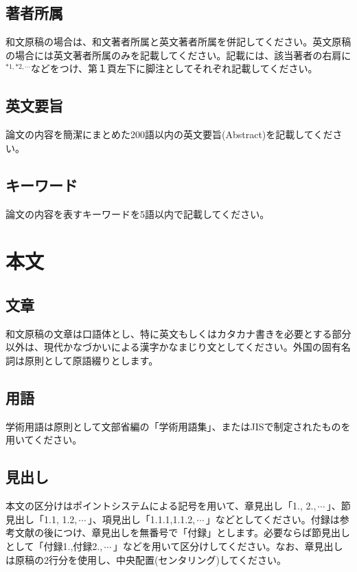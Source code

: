 \documentclass{hissymp}
\begin{document}
\subsection{著者所属}
和文原稿の場合は、和文著者所属と英文著者所属を併記してください。英文原稿の場合には英文著者所属のみを記載してください。記載には、該当著者の右肩に$^ {*1,*2,\cdots}$などをつけ、第１頁左下に脚注としてそれぞれ記載してください。

\subsection{英文要旨}
論文の内容を簡潔にまとめた200語以内の英文要旨(Abstract)を記載してください。

\subsection{キーワード}
論文の内容を表すキーワードを5語以内で記載してください。


\section{本文}

\subsection{文章}
和文原稿の文章は口語体とし、特に英文もしくはカタカナ書きを必要とする部分以外は、現代かなづかいによる漢字かなまじり文としてください。外国の固有名詞は原則として原語綴りとします。
\subsection{用語}
学術用語は原則として文部省編の「学術用語集」、またはJISで制定されたものを用いてください。
\subsection{見出し}
本文の区分けはポイントシステムによる記号を用いて、章見出し「1., 2.,\,$ \cdots $\,」、節見出し「1.1, 1.2,\,$ \cdots $\,」、項見出し「1.1.1,1.1.2,\,$ \cdots $\,」などとしてください。付録は参考文献の後につけ、章見出しを無番号で「付録」とします。必要ならば節見出しとして「付録1.,付録2.,\,$ \cdots $\,」などを用いて区分けしてください。なお、章見出しは原稿の2行分を使用し、中央配置(センタリング)してください。
\end{document}
